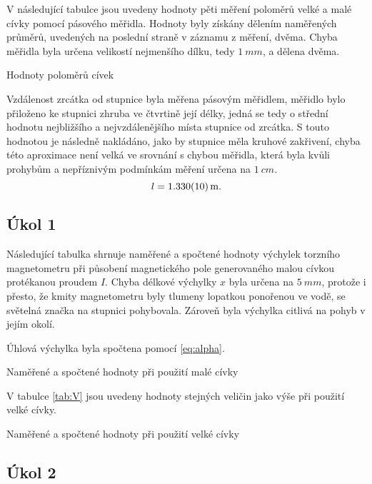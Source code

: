 \documentclass[0-protokol.tex]{subfiles}
\begin{document}
V následující tabulce jsou uvedeny hodnoty pěti měření poloměrů velké a malé cívky pomocí pásového měřidla. Hodnoty byly získány dělením naměřených průměrů, uvedených na poslední straně v záznamu z měření, dvěma. Chyba měřidla byla určena velikostí nejmenšího dílku, tedy $\SI{1}{mm}$, a dělena dvěma.
\begin{table}[H] 
\centering
\setlength{\tabcolsep}{10pt}

\caption{Hodnoty poloměrů cívek}
\label{tab:r}
\end{table}

Vzdálenost zrcátka od stupnice byla měřena pásovým měřidlem, měřidlo bylo přiloženo ke stupnici zhruba ve čtvrtině její délky, jedná se tedy o střední hodnotu nejbližšího a nejvzdálenějšího místa stupnice od zrcátka. S touto hodnotou je následně nakládáno, jako by stupnice měla kruhové zakřivení, chyba této aproximace není velká ve srovnání s chybou měřidla, která byla kvůli prohybům a nepříznivým podmínkám měření určena na $\SI{1}{cm}$.
$$ l = \SI{1.330 \pm 0.010}{m}. $$

\subsection*{Úkol 1}

Následující tabulka shrnuje naměřené a spočtené hodnoty výchylek torzního magnetometru při působení magnetického pole generovaného malou cívkou protékanou proudem $I$. Chyba délkové výchylky $x$ byla určena na $\SI{5}{mm}$, protože i přesto, že kmity magnetometru byly tlumeny lopatkou ponořenou ve vodě, se světelná značka na stupnici pohybovala. Zároveň byla výchylka citlivá na pohyb v jejím okolí. 

Úhlová výchylka byla spočtena pomocí \eqref{eq:alpha}. 
\begin{table}[H] 
\centering
\setlength{\tabcolsep}{10pt}

\caption{Naměřené a spočtené hodnoty při použití malé cívky}
\label{tab:M}
\end{table}
\newpage
V tabulce \ref{tab:V} jsou uvedeny hodnoty stejných veličin jako výše při použití velké cívky.
\begin{table}[H] 
\centering
\setlength{\tabcolsep}{10pt}

\caption{Naměřené a spočtené hodnoty při použití velké cívky}
\label{tab:V}
\end{table}

\subsection*{Úkol 2}
\end{document}

